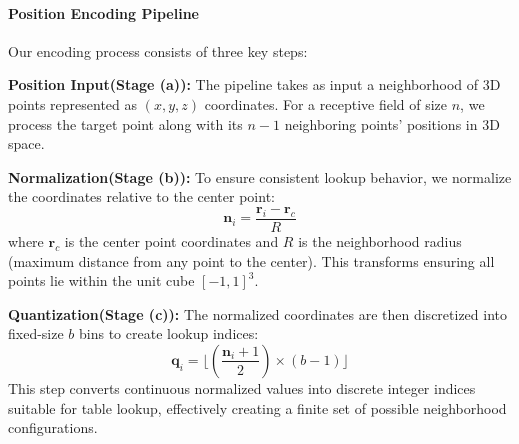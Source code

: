 \paragraph{Position Encoding Pipeline}
Our encoding process consists of three key steps:

\BULLET \textbf{Position Input(Stage (a)):} The pipeline takes as input a neighborhood of 3D points represented as $(x,y,z)$ coordinates. For a receptive field of size $n$, we process the target point along with its $n-1$ neighboring points' positions in 3D space.

\BULLET \textbf{Normalization(Stage (b)):} To ensure consistent lookup behavior, we normalize the coordinates relative to the center point:
\begin{equation}
    \mathbf{n}_i = \frac{\mathbf{r}_i - \mathbf{r}_c}{R}
\end{equation}
where $\mathbf{r}_c$ is the center point coordinates and $R$ is the neighborhood radius (maximum distance from any point to the center). This transforms ensuring all points lie within the unit cube $[-1,1]^3$.

\BULLET \textbf{Quantization(Stage (c)):} The normalized coordinates are then discretized into fixed-size $b$ bins to create lookup indices:
\begin{equation}
    \mathbf{q}_i = \lfloor (\frac{\mathbf{n}_i + 1}{2}) \times (b-1) \rfloor
\end{equation}
 This step converts continuous normalized values into discrete integer indices suitable for table lookup, effectively creating a finite set of possible neighborhood configurations. 

